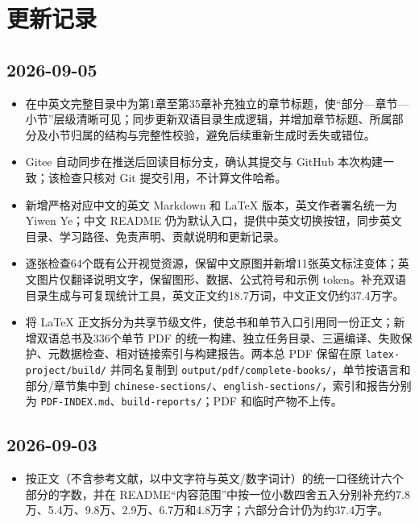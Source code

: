 \hypertarget{ux66f4ux65b0ux8bb0ux5f55}{%
\chapter{更新记录}\label{ux66f4ux65b0ux8bb0ux5f55}}

\hypertarget{section}{%
\section{2026-09-05}\label{section}}

\begin{itemize}
\tightlist
\item
  在中英文完整目录中为第1章至第35章补充独立的章节标题，使``部分---章节---小节''层级清晰可见；同步更新双语目录生成逻辑，并增加章节标题、所属部分及小节归属的结构与完整性校验，避免后续重新生成时丢失或错位。
\item
  Gitee 自动同步在推送后回读目标分支，确认其提交与 GitHub 本次构建一致；该检查只核对 Git 提交引用，不计算文件哈希。
\item
  新增严格对应中文的英文 Markdown 和 LaTeX 版本，英文作者署名统一为 Yiwen Ye；中文 README 仍为默认入口，提供中英文切换按钮，同步英文目录、学习路径、免责声明、贡献说明和更新记录。
\item
  逐张检查64个既有公开视觉资源，保留中文原图并新增11张英文标注变体；英文图片仅翻译说明文字，保留图形、数据、公式符号和示例 token。补充双语目录生成与可复现统计工具，英文正文约18.7万词，中文正文仍约37.4万字。
\item
  将 LaTeX 正文拆分为共享节级文件，使总书和单节入口引用同一份正文；新增双语总书及336个单节 PDF 的统一构建、独立任务目录、三遍编译、失败保护、元数据检查、相对链接索引与构建报告。两本总 PDF 保留在原 \texttt{latex-project/build/} 并同名复制到 \texttt{output/pdf/complete-books/}，单节按语言和部分/章节集中到 \texttt{chinese-sections/}、\texttt{english-sections/}，索引和报告分别为 \texttt{PDF-INDEX.md}、\texttt{build-reports/}；PDF 和临时产物不上传。
\end{itemize}

\hypertarget{section-1}{%
\section{2026-09-03}\label{section-1}}

\begin{itemize}
\tightlist
\item
  按正文（不含参考文献，以中文字符与英文/数字词计）的统一口径统计六个部分的字数，并在 README``内容范围''中按一位小数四舍五入分别补充约7.8万、5.4万、9.8万、2.9万、6.7万和4.8万字；六部分合计仍为约37.4万字。
\end{itemize}

